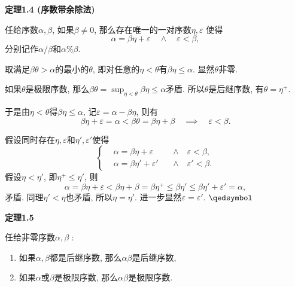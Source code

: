\documentclass[UTF8]{ctexart}
\begin{document}
\hypertarget{sec:定理1.4}{}
\noindent\textbf{定理1.4 (序数带余除法)}

任给序数$\alpha,\beta$, 如果$\beta\neq 0$, 那么存在唯一的一对序数$\eta,\varepsilon$
使得
\[
    \alpha=\beta\eta+\varepsilon\quad\land\quad\varepsilon<\beta,
\]
分别记作$\alpha/\beta$和$\alpha\%\beta$.



取满足$\beta\theta>\alpha$的最小的$\theta$,
即对任意的$\eta<\theta$有$\beta\eta\leqslant\alpha$. 显然$\theta$非零.

\vspace{3pt}
如果$\theta$是极限序数, 那么$\displaystyle\beta\theta=\sup_{\eta<\theta}\beta\eta
\leqslant\alpha$矛盾. 所以$\theta$是后继序数, 有$\theta=\eta^+$.

\vspace{3pt}
于是由$\eta<\theta$得$\beta\eta\leqslant\alpha$,
记$\varepsilon=\alpha-\beta\eta$, 则有
\[
    \beta\eta+\varepsilon=\alpha<\beta\theta=\beta\eta+\beta\quad\implies\quad
    \varepsilon<\beta.
\]


假设同时存在$\eta,\varepsilon$和$\eta',\varepsilon'$使得
\[\left\{\begin{aligned}
    &\alpha=\beta\eta+\varepsilon\,&&\land\quad\varepsilon<\beta,\\[-3pt]
    &\alpha=\beta\eta'+\varepsilon'\,&&\land\quad\varepsilon'<\beta.
\end{aligned}\right.\]
假设$\eta<\eta'$, 即$\eta^+\leqslant\eta'$, 则
\[
    \alpha=\beta\eta+\varepsilon<\beta\eta+\beta=\beta\eta^+\leqslant
    \beta\eta'\leqslant\beta\eta'+\varepsilon'=\alpha,
\]
矛盾. 同理$\eta'<\eta$也矛盾, 所以$\eta=\eta'$.
进一步显然$\varepsilon=\varepsilon'$. \hfill $\qedsymbol$

\vspace{10pt}

\hypertarget{sec:定理1.5}{}
\noindent\textbf{定理1.5}

任给非零序数$\alpha,\beta$ :
\begin{enumerate}
    \item 如果$\alpha,\beta$都是后继序数, 那么$\alpha\beta$是后继序数,
    \item 如果$\alpha$或$\beta$是极限序数, 那么$\alpha\beta$是极限序数.
\end{enumerate}

\end{document}
